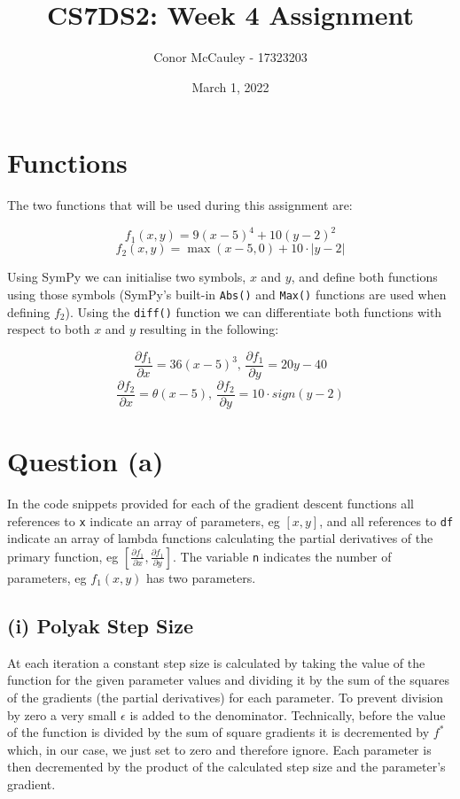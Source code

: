 \documentclass[12pt]{article}
\title{CS7DS2: Week 4 Assignment}
\author{Conor McCauley - 17323203}
\date{March 1, 2022}
\begin{document}
\maketitle

\section*{Functions}

The two functions that will be used during this assignment are:

$$f_1(x, y) = 9 (x - 5)^4 + 10 (y - 2)^2$$
$$f_2(x, y) = \max(x - 5, 0) + 10 \cdot |y - 2|$$

Using SymPy we can initialise two symbols, $x$ and $y$, and define both functions using those symbols (SymPy's built-in \texttt{Abs()} and \texttt{Max()} functions are used when defining $f_2$). Using the \texttt{diff()} function we can differentiate both functions with respect to both $x$ and $y$ resulting in the following:

$$\frac{\partial f_1}{\partial x} = 36 (x - 5)^3,\, \frac{\partial f_1}{\partial y} = 20y - 40$$
$$\frac{\partial f_2}{\partial x} = \theta(x - 5),\, \frac{\partial f_2}{\partial y} = 10\cdot sign(y - 2)$$

\section*{Question (a)}

In the code snippets provided for each of the gradient descent functions all references to \texttt{x} indicate an array of parameters, eg $[x, y]$, and all references to \texttt{df} indicate an array of lambda functions calculating the partial derivatives of the primary function, eg $[\frac{\partial f_1}{\partial x}, \frac{\partial f_1}{\partial y}]$. The variable \texttt{n} indicates the number of parameters, eg $f_1(x, y)$ has two parameters.

\subsection*{(i) Polyak Step Size}

At each iteration a constant step size is calculated by taking the value of the function for the given parameter values and dividing it by the sum of the squares of the gradients (the partial derivatives) for each parameter. To prevent division by zero a very small $\epsilon$ is added to the denominator. Technically, before the value of the function is divided by the sum of square gradients it is decremented by $f^*$ which, in our case, we just set to zero and therefore ignore. Each parameter is then decremented by the product of the calculated step size and the parameter's gradient.
\end{document}
